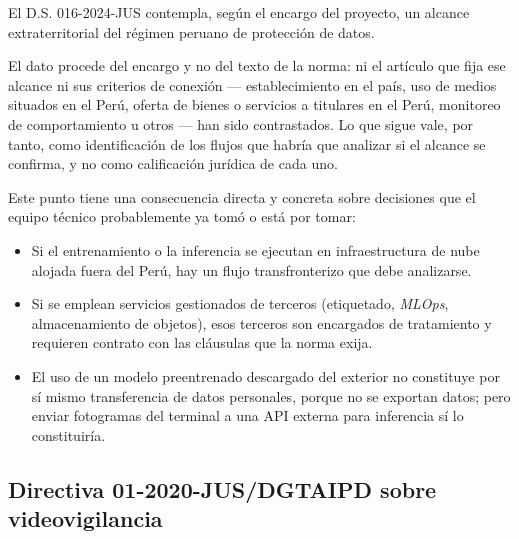 El D.S. 016-2024-JUS contempla, según el encargo del proyecto, un alcance
extraterritorial del régimen peruano de protección de datos.

El dato procede del encargo y no del texto de la norma: ni el artículo
que fija ese alcance ni sus criterios de conexión --- establecimiento en
el país, uso de medios situados en el Perú, oferta de bienes o servicios
a titulares en el Perú, monitoreo de comportamiento u otros --- han sido
contrastados. Lo que sigue vale, por tanto, como identificación de los
flujos que habría que analizar si el alcance se confirma, y no como
calificación jurídica de cada uno.

Este punto tiene una consecuencia directa y concreta sobre decisiones que
el equipo técnico probablemente ya tomó o está por tomar:

\begin{itemize}[leftmargin=1.5em,itemsep=0.3em]
  \item Si el entrenamiento o la inferencia se ejecutan en infraestructura
        de nube alojada fuera del Perú, hay un flujo transfronterizo que
        debe analizarse.
  \item Si se emplean servicios gestionados de terceros (etiquetado,
        \emph{MLOps}, almacenamiento de objetos), esos terceros son
        encargados de tratamiento y requieren contrato con las cláusulas
        que la norma exija.
  \item El uso de un modelo preentrenado descargado del exterior no
        constituye por sí mismo transferencia de datos personales, porque
        no se exportan datos; pero enviar fotogramas del terminal a una
        API externa para inferencia sí lo constituiría.
\end{itemize}


\subsection{Directiva 01-2020-JUS/DGTAIPD sobre videovigilancia}
\label{sec:directiva}

